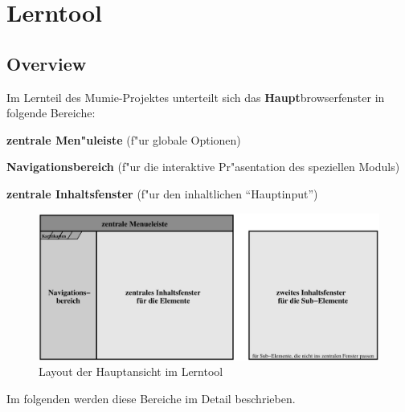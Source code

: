 
\section{Lerntool}\label{lerntool}


\subsection{Overview}\label{overview}
 
 
Im Lernteil des Mumie-Projektes unterteilt sich das
\textbf{Haupt}browserfenster in folgende Bereiche:
 
\begin{list_sabina}
        \item \textbf{zentrale Men"uleiste} (f"ur globale Optionen)
        \item \textbf{Navigationsbereich} (f"ur die interaktive Pr"asentation des speziellen Moduls)
        \item \textbf{zentrale Inhaltsfenster} (f"ur den inhaltlichen ``Hauptinput'')
\end{list_sabina}                                                                                     

\begin{figure}[h]
\begin{center}
\ifx\pdfoutput\undefined
\else
  \includegraphics{Skizzen/gesamtszenario_01.pdf}
\fi
\caption{Layout der Hauptansicht im Lerntool}
\end{center}
\end{figure}                                   

Im folgenden werden diese Bereiche im Detail beschrieben.
                                  

